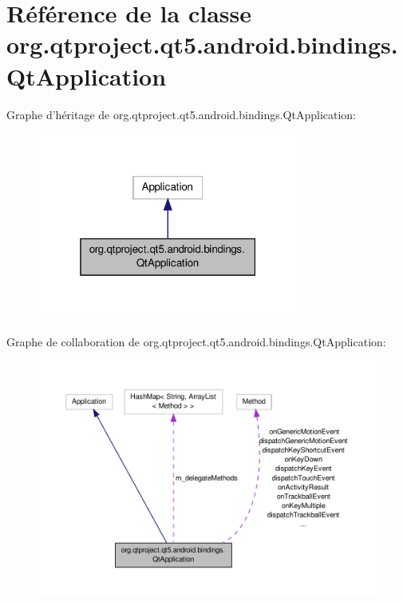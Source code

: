 \hypertarget{classorg_1_1qtproject_1_1qt5_1_1android_1_1bindings_1_1_qt_application}{\section{Référence de la classe org.\-qtproject.\-qt5.\-android.\-bindings.\-Qt\-Application}
\label{classorg_1_1qtproject_1_1qt5_1_1android_1_1bindings_1_1_qt_application}
}


Graphe d'héritage de org.\-qtproject.\-qt5.\-android.\-bindings.\-Qt\-Application\-:\nopagebreak
\begin{figure}[H]
\begin{center}
\leavevmode
\includegraphics[width=244pt]{classorg_1_1qtproject_1_1qt5_1_1android_1_1bindings_1_1_qt_application__inherit__graph}
\end{center}
\end{figure}


Graphe de collaboration de org.\-qtproject.\-qt5.\-android.\-bindings.\-Qt\-Application\-:\nopagebreak
\begin{figure}[H]
\begin{center}
\leavevmode
\includegraphics[width=350pt]{classorg_1_1qtproject_1_1qt5_1_1android_1_1bindings_1_1_qt_application__coll__graph}
\end{center}
\end{figure}

